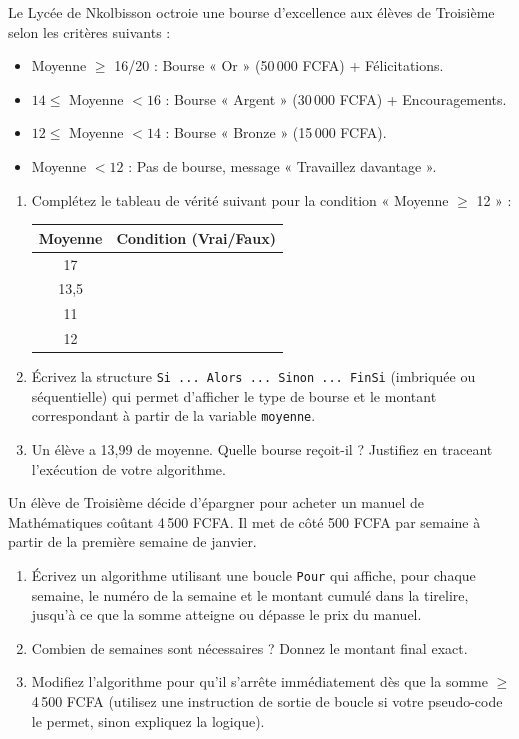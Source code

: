 \documentclass[11pt]{article}
\begin{document}
\begin{exercice}
Le Lycée de Nkolbisson octroie une bourse d'excellence aux élèves de Troisième selon les critères suivants :
\begin{itemize}
    \item Moyenne $\ge$ 16/20 : Bourse « Or » (50\,000 FCFA) + Félicitations.
    \item $14 \le$ Moyenne $< 16$ : Bourse « Argent » (30\,000 FCFA) + Encouragements.
    \item $12 \le$ Moyenne $< 14$ : Bourse « Bronze » (15\,000 FCFA).
    \item Moyenne $< 12$ : Pas de bourse, message « Travaillez davantage ».
\end{itemize}
\begin{enumerate}
    \item Complétez le tableau de vérité suivant pour la condition « Moyenne $\ge$ 12 » :
    \begin{center}
    \begin{tabular}{|c|c|}
    \hline Moyenne & Condition (Vrai/Faux) \\ \hline
    17 & \\ \hline
    13,5 & \\ \hline
    11 & \\ \hline
    12 & \\ \hline
    \end{tabular}
    \end{center}
    \item Écrivez la structure \texttt{Si ... Alors ... Sinon ... FinSi} (imbriquée ou séquentielle) qui permet d'afficher le type de bourse et le montant correspondant à partir de la variable \texttt{moyenne}.
    \item Un élève a 13,99 de moyenne. Quelle bourse reçoit-il ? Justifiez en traceant l'exécution de votre algorithme.
\end{enumerate}
\end{exercice}

\begin{exercice}
Un élève de Troisième décide d'épargner pour acheter un manuel de Mathématiques coûtant 4\,500 FCFA. Il met de côté 500 FCFA par semaine à partir de la première semaine de janvier.
\begin{enumerate}
    \item Écrivez un algorithme utilisant une boucle \texttt{Pour} qui affiche, pour chaque semaine, le numéro de la semaine et le montant cumulé dans la tirelire, jusqu'à ce que la somme atteigne ou dépasse le prix du manuel.
    \item Combien de semaines sont nécessaires ? Donnez le montant final exact.
    \item Modifiez l'algorithme pour qu'il s'arrête immédiatement dès que la somme $\ge$ 4\,500 FCFA (utilisez une instruction de sortie de boucle si votre pseudo-code le permet, sinon expliquez la logique).
\end{enumerate}
\end{exercice}
\end{document}
